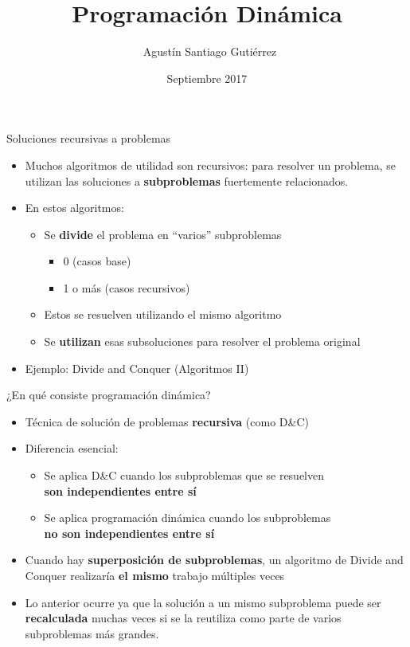 \documentclass{beamer}
\title{Programación Dinámica}  %
\author[Agustín Gutiérrez] %
{~Agustín Santiago Gutiérrez}
\institute[UBA-FCEN] %
{
  Facultad de Ciencias Exactas y Naturales\\
  Universidad de Buenos Aires
}
\date %
{Septiembre 2017}
\begin{document}
\begin{frame}
  \titlepage
\end{frame}


\begin{frame}{Soluciones recursivas a problemas}

  \begin{itemize}
   \item Muchos algoritmos de utilidad son recursivos: para resolver un problema, se utilizan las soluciones a \textbf{subproblemas} fuertemente relacionados.
   \item En estos algoritmos:
       \begin{itemize}
            \item Se \textbf{divide} el problema en ``varios'' subproblemas
               \begin{itemize}
                    \item 0 (casos base)
                    \item 1 o más (casos recursivos)
               \end{itemize} 
            \item Estos se resuelven utilizando el mismo algoritmo
            \item Se \textbf{utilizan} esas subsoluciones para resolver el problema original
       \end{itemize}
   \item Ejemplo: Divide and Conquer (Algoritmos II)
  \end{itemize}
  
\end{frame}

\begin{frame}{¿En qué consiste programación dinámica?}
  \begin{itemize}
   \item Técnica de solución de problemas \textbf{recursiva} (como D\&C)
   \item Diferencia esencial: 
          \begin{itemize}
              \item Se aplica D\&C cuando los subproblemas que se resuelven \\ \textbf{son independientes entre sí}
              \item Se aplica programación dinámica cuando los subproblemas \\ \textbf{no son independientes entre sí}
          \end{itemize}  
   \item Cuando hay \textbf{superposición de subproblemas}, un algoritmo de Divide and Conquer realizaría \textbf{el mismo} trabajo múltiples veces
   \item Lo anterior ocurre ya que la solución a un mismo subproblema puede
   ser \textbf{recalculada} muchas veces si se la reutiliza como parte de varios subproblemas más grandes.
  \end{itemize}
    
\end{frame}
\end{document}
